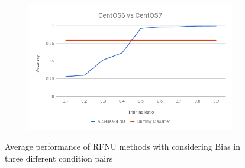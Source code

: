 \documentclass[10pt, conference, compsocconf]{IEEEtran}
\begin{document}
\begin{figure}[h!]
\begin{subfigure}[b]{0.8\linewidth}
        \end{subfigure}
        \begin{subfigure}[b]{0.8\linewidth}
                \includegraphics[width=\columnwidth]{figures/ALS-Bias/RFNU-ALS-Bias-6vs7-PFS}
        \end{subfigure}
        \caption{Average performance of RFNU methods with considering Bias in three different condition pairs}
        \label{fig:RFNU method}
\end{figure}
\end{document}
